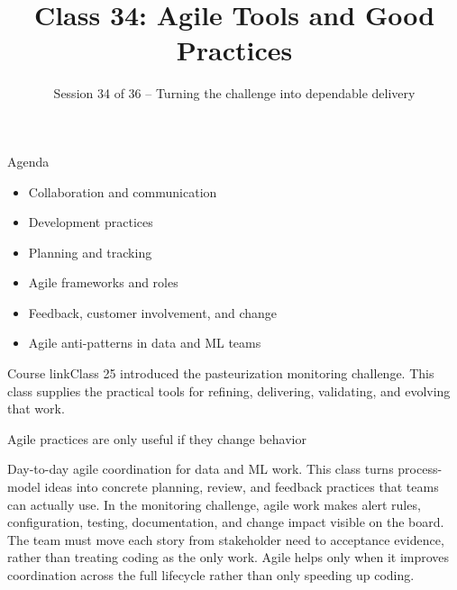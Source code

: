 

\title{Class 34: Agile Tools and Good Practices}
\subtitle{Session 34 of 36 -- Turning the challenge into dependable delivery}
\author{\coursename}
\date{}


\frame{\titlepage \coursefooter}

\begin{frame}{Agenda}
\begin{itemize}
\item Collaboration and communication
\item Development practices
\item Planning and tracking
\item Agile frameworks and roles
\item Feedback, customer involvement, and change
\item Agile anti-patterns in data and ML teams
\end{itemize}
\begin{block}{Course link}Class 25 introduced the pasteurization monitoring challenge. This class supplies the practical tools for refining, delivering, validating, and evolving that work.\end{block}
\coursefooter
\end{frame}

\begin{frame}{Agile practices are only useful if they change behavior}
\coursefooter
\end{frame}

\coursecontextframe
{Day-to-day agile coordination for data and ML work.}
{This class turns process-model ideas into concrete planning, review, and feedback practices that teams can actually use.}
{In the monitoring challenge, agile work makes alert rules, configuration, testing, documentation, and change impact visible on the board.}
{The team must move each story from stakeholder need to acceptance evidence, rather than treating coding as the only work.}
{Agile helps only when it improves coordination across the full lifecycle rather than only speeding up coding.}

